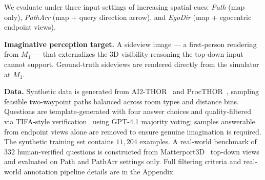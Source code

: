 We evaluate under three input settings of increasing spatial cues: \emph{Path} (map only), \emph{PathArr} (map + query direction arrow), and \emph{EgoDir} (map + egocentric endpoint views).

\noindent\textbf{Imaginative perception target.} A sideview image — a first-person rendering from $M_1$ — that externalizes the 3D visibility reasoning the top-down input cannot support. Ground-truth sideviews are rendered directly from the simulator at $M_1$.

\noindent\textbf{Data.}
Synthetic data is generated from AI2-THOR~\cite{kolve2017ai2} and ProcTHOR~\cite{deitke2022procthor}, sampling feasible two-waypoint paths balanced across room types and distance bins.
Questions are template-generated with four answer choices and quality-filtered via TIFA-style verification~\cite{hu2023tifa} using GPT-4.1 majority voting; samples answerable from endpoint views alone are removed to ensure genuine imagination is required.
The synthetic training set contains $11{,}204$ examples.
A real-world benchmark of $332$ human-verified questions is constructed from Matterport3D~\cite{chang2017matterport3d} top-down views and evaluated on Path and PathArr settings only.
Full filtering criteria and real-world annotation pipeline details are in the Appendix.
